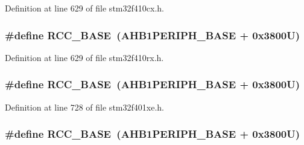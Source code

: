 Definition at line 629 of file stm32f410cx.\+h.

\subsubsection[{\texorpdfstring{R\+C\+C\+\_\+\+B\+A\+SE}{RCC_BASE}}]{\setlength{\rightskip}{0pt plus 5cm}\#define R\+C\+C\+\_\+\+B\+A\+SE~({\bf A\+H\+B1\+P\+E\+R\+I\+P\+H\+\_\+\+B\+A\+SE} + 0x3800\+U)}\hypertarget{group___peripheral__registers__structures_ga0e681b03f364532055d88f63fec0d99d}{}\label{group___peripheral__registers__structures_ga0e681b03f364532055d88f63fec0d99d}


Definition at line 629 of file stm32f410rx.\+h.

\subsubsection[{\texorpdfstring{R\+C\+C\+\_\+\+B\+A\+SE}{RCC_BASE}}]{\setlength{\rightskip}{0pt plus 5cm}\#define R\+C\+C\+\_\+\+B\+A\+SE~({\bf A\+H\+B1\+P\+E\+R\+I\+P\+H\+\_\+\+B\+A\+SE} + 0x3800\+U)}\hypertarget{group___peripheral__registers__structures_ga0e681b03f364532055d88f63fec0d99d}{}\label{group___peripheral__registers__structures_ga0e681b03f364532055d88f63fec0d99d}


Definition at line 728 of file stm32f401xe.\+h.

\subsubsection[{\texorpdfstring{R\+C\+C\+\_\+\+B\+A\+SE}{RCC_BASE}}]{\setlength{\rightskip}{0pt plus 5cm}\#define R\+C\+C\+\_\+\+B\+A\+SE~({\bf A\+H\+B1\+P\+E\+R\+I\+P\+H\+\_\+\+B\+A\+SE} + 0x3800\+U)}\hypertarget{group___peripheral__registers__structures_ga0e681b03f364532055d88f63fec0d99d}{}\label{group___peripheral__registers__structures_ga0e681b03f364532055d88f63fec0d99d}


